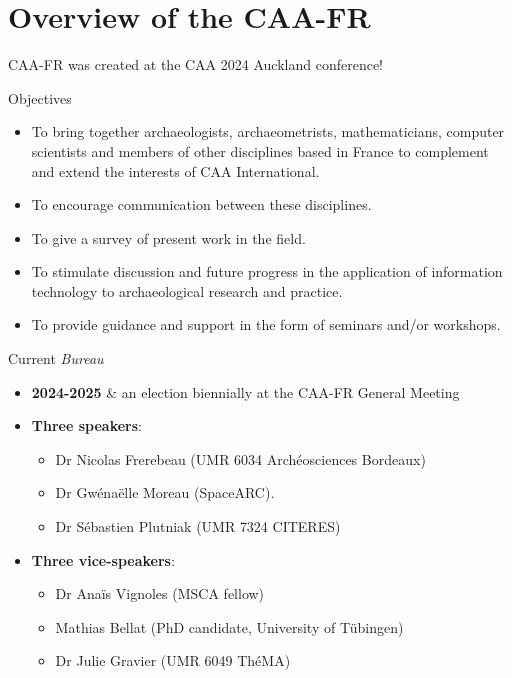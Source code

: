 \documentclass[xcolor=dvipsnames, 10pt, french, american]{beamer}
\begin{document}
\section{Overview of the CAA-FR} 
\frame{\tableofcontents[sectionstyle=show/shaded, subsectionstyle=show/hide/hide]}
 

\begin{frame}
    CAA-FR was created at the CAA 2024 Auckland conference!
    \begin{block}{Objectives}
        \begin{itemize}
            \item To bring together archaeologists, archaeometrists, mathematicians, computer scientists and members of other disciplines based in France to complement and extend the interests of CAA International.
            \item To encourage communication between these disciplines.
            \item To give a survey of present work in the field.
            \item To stimulate discussion and future progress in the application of information technology to archaeological research and practice.
            \item To provide guidance and support in the form of seminars and/or workshops.
        \end{itemize}
    \end{block}
\end{frame}
    

\begin{frame}
    \begin{block}{Current \textit{Bureau}}
        \begin{itemize}
            \item \textbf{2024-2025} \& an election biennially at the CAA-FR General Meeting %
            \item \textbf{Three speakers}:
                \begin{itemize}
                    \item Dr Nicolas Frerebeau (UMR 6034 Archéosciences Bordeaux)
                    \item Dr Gwénaëlle Moreau (SpaceARC).%
                    \item Dr Sébastien Plutniak (UMR 7324 CITERES)
                \end{itemize}
            \item \textbf{Three vice-speakers}:
                \begin{itemize}
                    \item Dr Anaïs Vignoles (MSCA fellow)
                    \item Mathias Bellat (PhD candidate, University of Tübingen) 
                    \item Dr Julie Gravier (UMR 6049 ThéMA)
                \end{itemize}
        \end{itemize}
    \end{block}
\end{frame}
\end{document}
